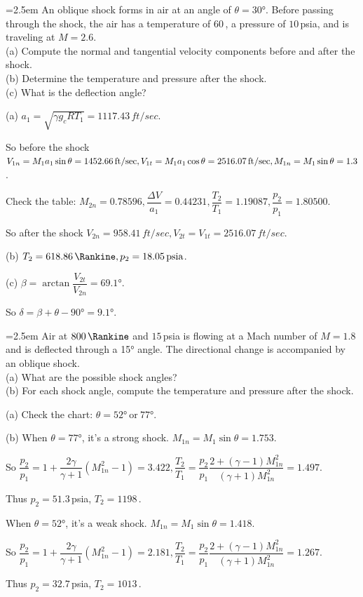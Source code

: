 \documentclass[12pt]{article}
\newlength{\questionlabelwidth}
\newcommand{\question}[2]{%
  \par\noindent
  {\hangindent=2.5em %
   \hangafter=1 %
   \makebox[\questionlabelwidth][l]{\textbf{#1}}#2\par}%
}
\begin{document}
\question{7.6}{An oblique shock forms in air at an angle of $\theta = \ang{30}$. Before passing through the shock, the air has a temperature of $60$\,\si{\Fahrenheit}, a pressure of $10$\,\si{psia}, and is traveling at $M = 2.6$.\\
(a) Compute the normal and tangential velocity components before and after the shock.\\
(b) Determine the temperature and pressure after the shock.\\
(c) What is the deflection angle?
}

\begin{answerbox}
(a) $a_1=\sqrt{\gamma g_c R T_1}=1117.43\,\si{ft/sec}$.

So before the shock $V_{1n}=M_1a_1\sin\theta=1452.66\,\si{ft/sec}, \\V_{1t}=M_1a_1\cos\theta=2516.07\,\si{ft/sec}, M_{1n}=M_1\sin\theta=1.3$.

Check the table: $M_{2n}=0.78596, \dfrac{\Delta V}{a_1}=0.44231, \dfrac{T_2}{T_1}=1.19087, \dfrac{p_2}{p_1}=1.80500$.

So after the shock $V_{2n}=958.41\,\si{ft/sec}, V_{2t}=V_{1t}=2516.07\,\si{ft/sec}$.

(b) $T_2=618.86\,\si{\Rankine}, p_2=18.05\,\si{psia}$.

(c) $\beta=\arctan\dfrac{V_{2t}}{V_{2n}}=\ang{69.1}$.

So $\delta =\beta+\theta-\ang{90}=\ang{9.1}$.
\end{answerbox}

\question{7.8}{Air at $800\,\si{\Rankine}$ and $15$\,\si{psia} is flowing at a Mach number of $M = 1.8$ and is deflected through a \ang{15} angle. The directional change is accompanied by an oblique shock.\\
(a) What are the possible shock angles?\\
(b) For each shock angle, compute the temperature and pressure after the shock.
}

\begin{answerbox}
(a) Check the chart: $\theta=\ang{52}~\text{or}~\ang{77}$.

(b) When $\theta=\ang{77}$, it's a strong shock. $M_{1n}=M_1\sin\theta=1.753$.

So $\dfrac{p_2}{p_1}=1+\dfrac{2\gamma}{\gamma+1}\left(M_{1n}^2-1\right)=3.422, \dfrac{T_2}{T_1}=\dfrac{p_2}{p_1}\dfrac{2+(\gamma-1)M_{1n}^2}{(\gamma+1)M_{1n}^2}=1.497$.

Thus $p_2=51.3$\,\si{psia}, $T_2=1198$\,\si{\Rankine}.

When $\theta=\ang{52}$, it's a weak shock. $M_{1n}=M_1\sin\theta=1.418$.

So $\dfrac{p_2}{p_1}=1+\dfrac{2\gamma}{\gamma+1}\left(M_{1n}^2-1\right)=2.181, \dfrac{T_2}{T_1}=\dfrac{p_2}{p_1}\dfrac{2+(\gamma-1)M_{1n}^2}{(\gamma+1)M_{1n}^2}=1.267$.

Thus $p_2=32.7$\,\si{psia}, $T_2=1013$\,\si{\Rankine}.
\end{answerbox}
\end{document}
